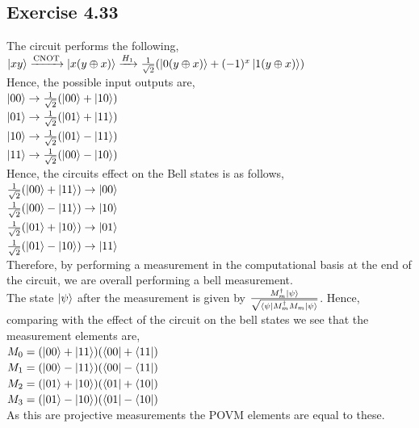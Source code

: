 \documentclass[a4paper,12pt]{article}
\begin{document}
\subsection*{Exercise 4.33}
The circuit performs the following,\\
$\ket{xy}\xrightarrow{\text{CNOT}}\ket{x(y\oplus x)}\xrightarrow{H_1}
\frac{1}{\sqrt{2}}(\ket{0(y\oplus x)}+(-1)^x\ket{1(y\oplus x)})$\\
Hence, the possible input outputs are,\\
$\ket{00}\rightarrow\frac{1}{\sqrt{2}}(\ket{00}+\ket{10})$\\
$\ket{01}\rightarrow\frac{1}{\sqrt{2}}(\ket{01}+\ket{11})$\\
$\ket{10}\rightarrow\frac{1}{\sqrt{2}}(\ket{01}-\ket{11})$\\
$\ket{11}\rightarrow\frac{1}{\sqrt{2}}(\ket{00}-\ket{10})$\\
Hence, the circuits effect on the Bell states is as follows,\\
$\frac{1}{\sqrt{2}}(\ket{00}+\ket{11})\rightarrow \ket{00}$\\
$\frac{1}{\sqrt{2}}(\ket{00}-\ket{11})\rightarrow \ket{10}$\\
$\frac{1}{\sqrt{2}}(\ket{01}+\ket{10})\rightarrow \ket{01}$\\
$\frac{1}{\sqrt{2}}(\ket{01}-\ket{10})\rightarrow \ket{11}$\\
Therefore, by performing a measurement in the computational basis
at the end of the circuit, we are overall performing a bell measurement.\\
The state $\ket{\psi}$ after the measurement is given by 
$\frac{M^\dagger_m\ket{\psi}}{\sqrt{\bra{\psi}M^\dagger_mM_m\ket{\psi}}}$. Hence,
comparing with the effect of the circuit on the bell states we see that
the measurement elements are,\\
$M_0=(\ket{00}+\ket{11})(\bra{00}+\bra{11})$\\
$M_1=(\ket{00}-\ket{11})(\bra{00}-\bra{11})$\\
$M_2=(\ket{01}+\ket{10})(\bra{01}+\bra{10})$\\
$M_3=(\ket{01}-\ket{10})(\bra{01}-\bra{10})$\\
As this are projective measurements the POVM elements are equal
to these.
\end{document}
